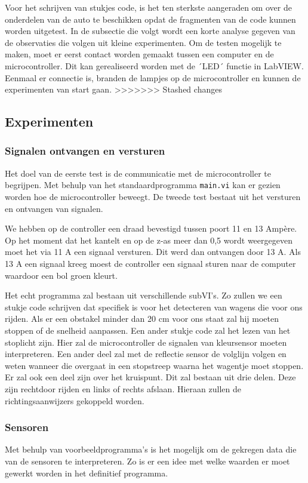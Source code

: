 \documentclass[a4paper,twoside,kulak]{kulakreport} %
\begin{document}
Voor het schrijven van stukjes code, is het ten sterkste aangeraden om over de onderdelen van de auto te beschikken opdat de fragmenten van de code kunnen worden uitgetest. In de subsectie die volgt wordt een korte analyse gegeven van de observaties die volgen uit kleine experimenten. Om de testen mogelijk te maken, moet er eerst contact worden gemaakt tussen een computer en de microcontroller. Dit kan gerealiseerd worden met de ´LED´ functie in LabVIEW. Eenmaal er connectie is, branden de lampjes op de microcontroller en kunnen de experimenten van start gaan.
>>>>>>> Stashed changes


\subsection{Experimenten}
\subsubsection{Signalen ontvangen en versturen}
Het doel van de eerste test is de communicatie met de microcontroller te begrijpen. Met behulp van het standaardprogramma \texttt{main.vi} kan er gezien worden hoe de microcontroller beweegt. 
De tweede test bestaat uit het versturen en ontvangen van signalen. 

 We hebben op de controller een draad bevestigd tussen poort 11 en 13 Ampère. Op het moment dat het kantelt en op de z-as meer dan 0,5 wordt weergegeven moet het via 11 A een signaal versturen. Dit werd dan ontvangen door 13 A. Als 13 A een signaal kreeg moest de controller een signaal sturen naar de computer waardoor een bol groen kleurt. 

Het echt programma zal bestaan uit verschillende subVI's. Zo zullen we een stukje code schrijven dat specifiek is voor het detecteren van wagens die voor ons rijden. Als er een obstakel minder dan 20 cm voor ons staat zal hij moeten stoppen of de snelheid aanpassen. Een ander stukje code zal het lezen van het stoplicht zijn. Hier zal de microcontroller de signalen van kleursensor moeten interpreteren. Een ander deel zal met de reflectie sensor de volglijn volgen en weten wanneer die overgaat in een stopstreep waarna het wagentje moet stoppen.
Er zal ook een deel zijn over het kruispunt. Dit zal bestaan uit drie delen. Deze zijn rechtdoor rijden en links of rechts afslaan. Hieraan zullen de richtingsaanwijzers gekoppeld worden. 

\subsubsection{Sensoren}
Met behulp van voorbeeldprogramma's is het mogelijk om de gekregen data die van de sensoren te interpreteren. Zo is er een idee met welke waarden er moet gewerkt worden in het definitief programma. 
\end{document}
